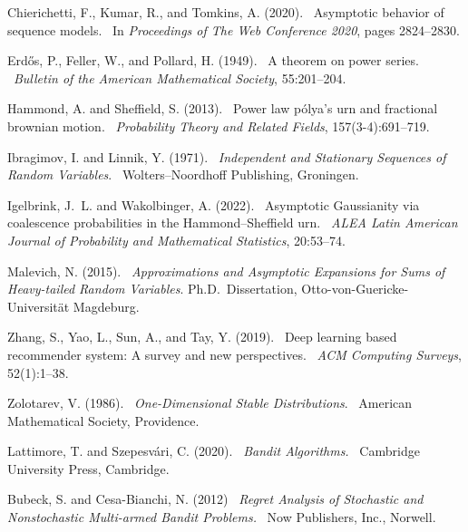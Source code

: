 \documentclass[12pt]{article}
\def\newblock{\ }%
\numberwithin{equation}{section} \font\titre=cmbx12
\begin{document}
\begin{thebibliography}{}
Chierichetti, F., Kumar, R., and Tomkins, A. (2020).
\newblock Asymptotic behavior of sequence models.
\newblock In {\em Proceedings of The Web Conference 2020}, pages 2824--2830.

Erd\H{o}s, P., Feller, W., and Pollard, H. (1949).
\newblock A theorem on power series.
\newblock {\em Bulletin of the American Mathematical Society}, 55:201--204.

Hammond, A. and Sheffield, S. (2013).
\newblock Power law p{\'o}lya’s urn and fractional brownian motion.
\newblock {\em Probability Theory and Related Fields}, 157(3-4):691--719.

Ibragimov, I. and Linnik, Y. (1971).
\newblock {\em Independent and Stationary Sequences of Random Variables}.
\newblock Wolters--Noordhoff Publishing, Groningen.

Igelbrink, J.~L. and Wakolbinger, A. (2022).
\newblock Asymptotic {G}aussianity via coalescence probabilities in the
  {H}ammond--{S}heffield urn.
  \newblock {\em ALEA Latin American Journal of Probability and Mathematical
  Statistics}, 20:53--74.


Malevich, N. (2015).
\newblock {\em Approximations and Asymptotic Expansions for Sums of
  Heavy-tailed Random Variables}.
  Ph.D.\ Dissertation, Otto-von-Guericke-Universit\"at Magdeburg.

Zhang, S., Yao, L., Sun, A., and Tay, Y. (2019).
\newblock Deep learning based recommender system: A survey and new
  perspectives.
\newblock {\em ACM Computing Surveys}, 52(1):1--38.

Zolotarev, V. (1986).
\newblock {\em One-{D}imensional Stable Distributions}.
\newblock American Mathematical Society, Providence.

Lattimore, T. and Szepesv{\'a}ri, C. (2020).
\newblock{\em Bandit {A}lgorithms.}
\newblock Cambridge University Press, Cambridge.

Bubeck, S. and Cesa-Bianchi, N. (2012)
\newblock{\em Regret {A}nalysis of {S}tochastic and {N}onstochastic {M}ulti-armed {B}andit {P}roblems.}
\newblock Now Publishers, Inc., Norwell.
\end{thebibliography}
\end{document}
